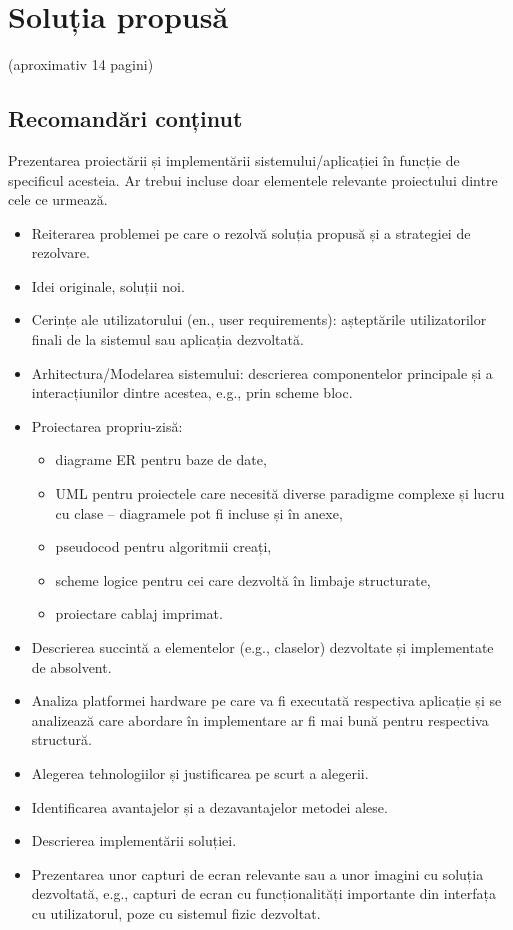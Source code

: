 \chapter{Soluția propusă}
\label{cap:cap3}

(aproximativ 14 pagini)

\section{Recomandări conținut}

Prezentarea proiectării și implementării sistemului/aplicației în funcție de specificul acesteia. Ar trebui incluse doar elementele relevante proiectului dintre cele ce urmează.

\begin{itemize}
    \item Reiterarea problemei pe care o rezolvă soluția propusă și a strategiei de rezolvare.
    \item Idei originale, soluții noi.
    \item Cerințe ale utilizatorului (en., user requirements): așteptările utilizatorilor finali de la sistemul sau aplicația dezvoltată.
    \item Arhitectura/Modelarea sistemului: descrierea componentelor principale și a interacțiunilor dintre acestea, e.g., prin scheme bloc.
    \item Proiectarea propriu-zisă:
    \begin{itemize}
        \item diagrame ER pentru baze de date,
        \item UML pentru proiectele care necesită diverse paradigme complexe și lucru cu clase – diagramele pot fi incluse și în anexe,
        \item pseudocod pentru algoritmii creați,
        \item scheme logice pentru cei care dezvoltă în limbaje structurate,
        \item proiectare cablaj imprimat.
    \end{itemize}
    \item Descrierea succintă a elementelor (e.g., claselor) dezvoltate și implementate de absolvent.
    \item Analiza platformei hardware pe care va fi executată respectiva aplicație și se analizează care abordare în implementare ar fi mai bună pentru respectiva structură.
    \item Alegerea tehnologiilor și justificarea pe scurt a alegerii.
    \item Identificarea avantajelor și a dezavantajelor metodei alese.
    \item Descrierea implementării soluției.
    \item Prezentarea unor capturi de ecran relevante sau a unor imagini cu soluția dezvoltată, e.g., capturi de ecran cu funcționalități importante din interfața cu utilizatorul, poze cu sistemul fizic dezvoltat.
\end{itemize}

